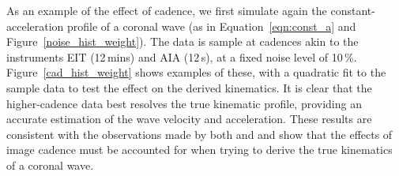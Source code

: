 \documentclass[structabstract]{aa}
\begin{document}
As an example of the effect of cadence, we first simulate again the constant-acceleration profile of a coronal wave (as in Equation~\ref{eqn:const_a} and Figure~\ref{noise_hist_weight}). The data is sample at cadences akin to the instruments EIT (12\,mins) and AIA (12\,s), at a fixed noise level of 10\,\%. Figure~\ref{cad_hist_weight} shows examples of these, with a quadratic fit to the sample data to test the effect on the derived kinematics. It is clear that the higher-cadence data best resolves the true kinematic profile, providing an accurate estimation of the wave velocity and acceleration. These results are consistent with the observations made by both \citet{2008ApJ...680L..81L} and \citet{2009ApJ...707..503M} and show that the effects of image cadence must be accounted for when trying to derive the true kinematics of a coronal wave.
\end{document}
